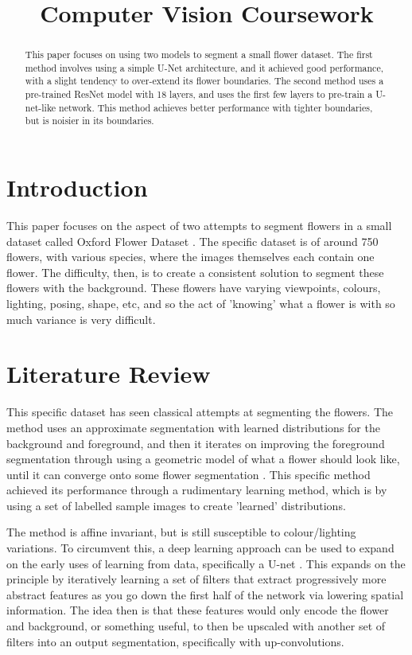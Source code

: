 \documentclass{article}
\title{Computer Vision Coursework}
\begin{document}
%
\maketitle
%
\begin{abstract}
This paper focuses on using two models to segment a small flower dataset. The first method involves using a simple U-Net architecture, and it achieved good performance, with a slight tendency to over-extend its flower boundaries. The second method uses a pre-trained ResNet model with 18 layers, and uses the first few layers to pre-train a U-net-like network. This method achieves better performance with tighter boundaries, but is noisier in its boundaries.
\end{abstract}

\section{Introduction}
\label{sec:intro}

This paper focuses on the aspect of two attempts to segment flowers in a small dataset called Oxford Flower Dataset \autocite{nilsbackVisualVocabularyFlower2006}. The specific dataset is of around 750 flowers, with various species, where the images themselves each contain one flower. The difficulty, then, is to create a consistent solution to segment these flowers with the background. These flowers have varying viewpoints, colours, lighting, posing, shape, etc, and so the act of 'knowing' what a flower is with so much variance is very difficult.
\section{Literature Review}
\label{sec:format}

This specific dataset has seen classical attempts at segmenting the flowers. The method uses an approximate segmentation with learned distributions for the background and foreground, and then it iterates on improving the foreground segmentation through using a geometric model of what a flower should look like, until it can converge onto some flower segmentation \autocite{nilsbackDelvingDeeperWhorl2010}. This specific method achieved its performance through a rudimentary learning method, which is by using a set of labelled sample images to create 'learned' distributions. 

The method is affine invariant, but is still susceptible to colour/lighting variations. To circumvent this, a deep learning approach can be used to expand on the early uses of learning from data, specifically a U-net \autocite{ronnebergerUNetConvolutionalNetworks2015}. This expands on the principle by iteratively learning a set of filters that extract progressively more abstract features as you go down the first half of the network via lowering spatial information. The idea then is that these features would only encode the flower and background, or something useful, to then be upscaled with another set of filters into an output segmentation, specifically with up-convolutions.
\end{document}
